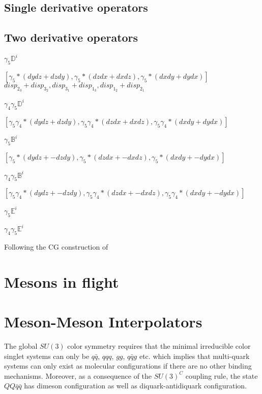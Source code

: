 \subsection{Single derivative operators}

\subsection{Two derivative operators}

$\gamma_5\mathbb{D}^i$

$[\gamma_5 * (dydz + dzdy), \gamma_5 * (dzdx + dxdz), \gamma_5 * (dxdy + dydx)]$
$disp_{2_3}+ disp_{3_2}, disp_{3_1} + disp_{1_3}, disp_{1_2} + disp_{2_1}$

$\gamma_4\gamma_5\mathbb{D}^i$

$[\gamma_5\gamma_4 * (dydz + dzdy), \gamma_5\gamma_4 * (dzdx + dxdz), \gamma_5\gamma_4 * (dxdy + dydx)]$

$\gamma_5\mathbb{B}^i$

$[\gamma_5 * (dydz + -dzdy), \gamma_5 * (dzdx + -dxdz), \gamma_5 * (dxdy + -dydx)]$

$\gamma_4\gamma_5\mathbb{B}^i$

$[\gamma_5\gamma_4 * (dydz + -dzdy), \gamma_5\gamma_4 * (dzdx + -dxdz), \gamma_5\gamma_4 * (dxdy + -dydx)]$

$\gamma_5\mathbb{E}^i$

$\gamma_4\gamma_5\mathbb{E}^i$



Following the CG construction of \cite{Basak_2005}

\section{Mesons in flight}

\section{Meson-Meson Interpolators}
The global $SU(3)$ color symmetry requires that the minimal irreducible color singlet systems can only be $q\bar{q}$, $qqq$, $gg$, $q\bar{q}g$ etc. which implies that multi-quark systems can only exist as molecular configurations if there are no other binding mechanisms. Moreover, as a consequence of the $SU(3)^C$ coupling rule, the state $QQ\bar{q}\bar{q}$ has dimeson configuration as well as diquark-antidiquark configuration. 

